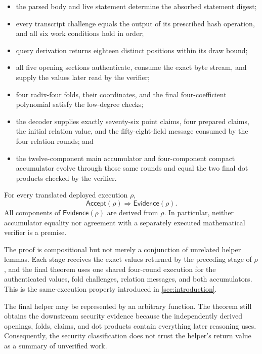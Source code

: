 \begin{itemize}[leftmargin=*]
  \item the parsed body and live statement determine the absorbed statement
        digest;
  \item every transcript challenge equals the output of its prescribed hash
        operation, and all six work conditions hold in order;
  \item query derivation returns eighteen distinct positions within its draw
        bound;
  \item all five opening sections authenticate, consume the exact byte stream,
        and supply the values later read by the verifier;
  \item four radix-four folds, their coordinates, and the final
        four-coefficient polynomial satisfy the low-degree checks;
  \item the decoder supplies exactly seventy-six point claims, four prepared
        claims, the initial relation value, and the fifty-eight-field message
        consumed by the four relation rounds; and
  \item the twelve-component main accumulator and four-component compact
        accumulator evolve through those same rounds and equal the two final
        dot products checked by the verifier.
\end{itemize}

\begin{theorem}
\label{thm:end-to-end-execution}
For every translated deployed execution \(\rho\),
\[
  \mathsf{Accept}(\rho)\Longrightarrow\mathsf{Evidence}(\rho).
\]
All components of \(\mathsf{Evidence}(\rho)\) are derived from \(\rho\).
In particular, neither accumulator equality nor agreement with a separately
executed mathematical verifier is a premise.
\end{theorem}

The proof is compositional but not merely a conjunction of unrelated helper
lemmas.  Each stage receives the exact values returned by the preceding stage
of \(\rho\), and the final theorem uses one shared four-round execution for
the authenticated values, fold challenges, relation messages, and both
accumulators.  This is the same-execution property introduced in
\cref{sec:introduction}.

The final helper may be represented by an arbitrary function.  The theorem
still obtains the downstream security evidence because the independently
derived openings, folds, claims, and dot products contain everything later
reasoning uses.  Consequently, the security classification does not trust the
helper's return value as a summary of unverified work.

